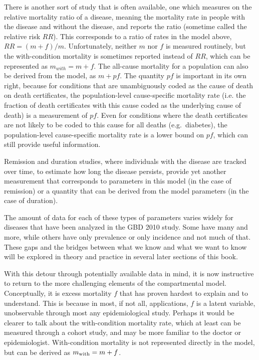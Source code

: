 There is another sort of study that is often available, one which
measures on the relative mortality ratio of a disease, meaning the
mortality rate in people with the disease and without the disease, and
reports the ratio (sometime called the relative risk $RR$).  This
corresponds to a ratio of rates in the model above, $RR = (m+f) / m$.
Unfortunately, neither $m$ nor $f$ is measured routinely, but the
with-condition mortality is sometimes reported instead of $RR$, which
can be represented as $m_{with} = m+f$.  The all-cause mortality for a
population can also be derived from the model, as $m + pf$.  The
quantity $pf$ is important in its own right, because for conditions
that are unambiguously coded as the cause of death on death
certificates, the population-level cause-specific mortality rate
(i.e. the fraction of death certificates with this cause coded as the
underlying cause of death) is a measurement of $pf$.  Even for
conditions where the death certificates are not likely to be coded to
this cause for all deaths (e.g.~diabetes), the population-level
cause-specific mortality rate is a lower bound on $pf$, which can
still provide useful information.

Remission and duration studies, where individuals with the disease are
tracked over time, to estimate how long the disease persists, provide
yet another measurement that corresponds to parameters in this model
(in the case of remission) or a quantity that can be derived from the
model parameters (in the case of duration).

The amount of data for each of these types of parameters varies widely
for diseases that have been analyzed in the GBD 2010 study. Some have
many and more, while others have only prevalence or only incidence and
not much of that. These gaps and the bridges between what we know and
what we want to know will be explored in theory and practice in
several later sections of this book.

With this detour through potentially available data in mind, it is now
instructive to return to the more challenging elements of the
compartmental model. Conceptually, it is excess mortality $f$ that has
proven hardest to explain and to understand. This is because in most,
if not all, applications, $f$ is a latent variable, unobservable
through most any epidemiological study. Perhaps it would be clearer to
talk about the with-condition mortality rate, which at least can be
measured through a cohort study, and may be more familiar to the
doctor or epidemiologist. With-condition mortality is not represented
directly in the model, but can be derived as $m_{\text{with}} = m+f$.

